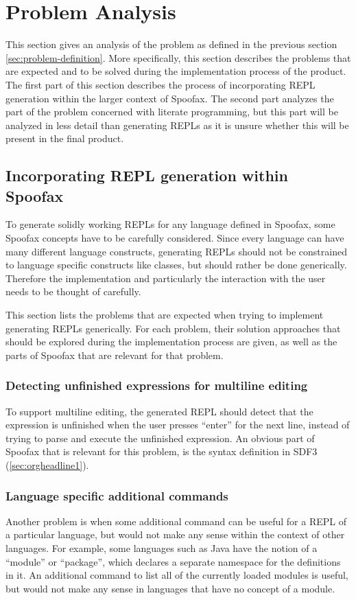 \section{Problem Analysis}
\label{sec:problem-analysis}
This section gives an analysis of the problem as defined in the
previous section \ref{sec:problem-definition}. More specifically, this
section describes the problems that are expected and to be solved
during the implementation process of the product. The first part of
this section describes the process of incorporating REPL generation
within the larger context of Spoofax. The second part analyzes the
part of the problem concerned with literate programming, but this part
will be analyzed in less detail than generating REPLs as it is unsure
whether this will be present in the final product.

\subsection{Incorporating REPL generation within Spoofax}
\label{ssec:incorp-repl-gener}
To generate solidly working REPLs for any language defined in Spoofax,
some Spoofax concepts have to be carefully considered. Since every
language can have many different language constructs, generating REPLs
should not be constrained to language specific constructs like
classes, but should rather be done generically. Therefore the
implementation and particularly the interaction with the user needs to
be thought of carefully.

This section lists the problems that are expected when trying to
implement generating REPLs generically. For each problem, their
solution approaches that should be explored during the implementation
process are given, as well as the parts of Spoofax that are relevant
for that problem.

\subsubsection{Detecting unfinished expressions for multiline editing}
\label{sec:detect-unfin-expr}
To support multiline editing, the generated REPL should detect that
the expression is unfinished when the user presses ``enter'' for the
next line, instead of trying to parse and execute the unfinished
expression. An obvious part of Spoofax that is relevant for this
problem, is the syntax definition in SDF3 (\cref{sec:orgheadline1}).

\subsubsection{Language specific additional commands}
\label{sec:lang-spec-addit}
Another problem is when some additional command can be useful for a
REPL of a particular language, but would not make any sense within the
context of other languages. For example, some languages such as Java
have the notion of a ``module'' or ``package'', which declares a
separate namespace for the definitions in it. An additional command to
list all of the currently loaded modules is useful, but would not make
any sense in languages that have no concept of a module.

